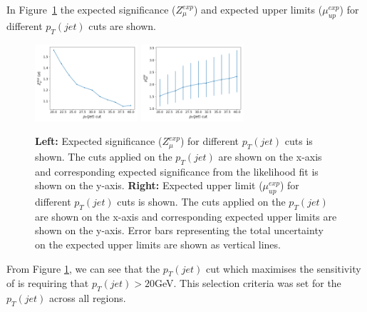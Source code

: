 In Figure~\ref{fig:4lep-jetpt-optimisation} the expected significance ($Z_{\mu}^{exp}$) and expected upper limits ($\mu_{up}^{exp}$) for different $p_{T}(jet)$ cuts are shown.
\begin{figure}[h!]
	\includegraphics[width = 0.34\textwidth]{figures/signif_jetPt.png}
  	\includegraphics[width = 0.34\textwidth]{figures/exp_upper_jetPt.png}
  \centering
	\caption{\textbf{Left:} Expected significance ($Z_{\mu}^{exp}$) for different $p_{T}(jet)$ cuts is shown. The cuts applied on the $p_{T}(jet)$ are shown on the x-axis and corresponding expected significance from the likelihood fit is shown on the y-axis. \textbf{Right:} Expected upper limit ($\mu_{up}^{exp}$) for different $p_{T}(jet)$ cuts is shown. The cuts applied on the $p_{T}(jet)$ are shown on the x-axis and corresponding expected upper limits are shown on the y-axis. Error bars representing the total uncertainty on the expected upper limits are shown as vertical lines.}
		\label{fig:4lep-jetpt-optimisation}
\end{figure}


From Figure \ref{fig:4lep-jetpt-optimisation}, we can see that the $p_{T}(jet)$ cut which maximises the sensitivity of \tWZ is requiring that $p_{T}(jet) > 20$GeV. This selection criteria was set for the $p_{T}(jet)$ across all regions.\\\\

